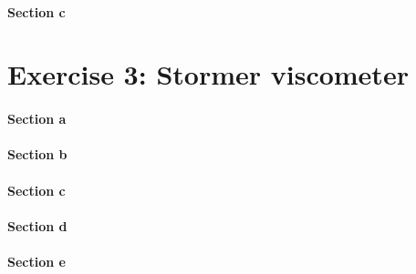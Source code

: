 \documentclass[
  11pt,
]{article}
\begin{document}
\paragraph{Section c}\label{section-c-1}

\section{Exercise 3: Stormer
viscometer}\label{exercise-3-stormer-viscometer}

\paragraph{Section a}\label{section-a-2}

\paragraph{Section b}\label{section-b-2}

\paragraph{Section c}\label{section-c-2}

\paragraph{Section d}\label{section-d-1}

\paragraph{Section e}\label{section-e-1}
\end{document}
